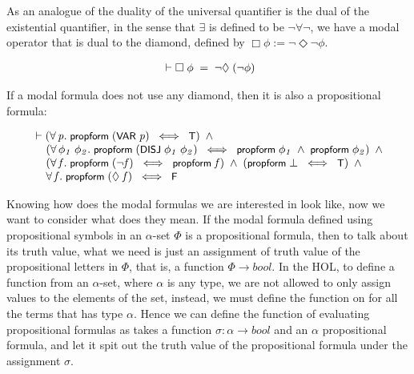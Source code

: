 \documentclass[letterpaper]{article}
\renewcommand{\HOLConst}[1]{{\textsf{\upshape\small #1}}}
\newenvironment{holmath}{\begin{displaymath}\begin{array}{l}}{\end{array}\end{displaymath}\ignorespacesafterend}
\begin{document}
As an analogue of the duality of the universal quantifier is the dual of the existential quantifier, in the sense that $\exists$ is defined to be $\lnot\forall\lnot$, we have a modal operator that is dual to the diamond, defined by $\Box \phi:= \lnot\Diamond \lnot \phi$. 

\begin{holmath}
  \ensuremath{\HOLTokenTurnstile}\HOLSymConst{\ensuremath{\Box}}\;\HOLFreeVar{\ensuremath{\phi}}\;\HOLSymConst{=}\;\HOLSymConst{\HOLTokenNeg{}}\HOLSymConst{\ensuremath{\Diamond}}\;(\HOLSymConst{\HOLTokenNeg{}}\HOLFreeVar{\ensuremath{\phi}})
\end{holmath}

If a modal formula does not use any diamond, then it is also a propositional formula:

\begin{holmath}
  \ensuremath{\HOLTokenTurnstile}(\HOLSymConst{\HOLTokenForall{}}\HOLBoundVar{p}.\;\HOLConst{propform}\;(\HOLConst{VAR}\;\HOLBoundVar{p})\;\HOLSymConst{\HOLTokenEquiv{}}\;\HOLConst{T})\;\HOLSymConst{\HOLTokenConj{}}\\
\;\;\;\;\;(\HOLSymConst{\HOLTokenForall{}}\HOLBoundVar{\ensuremath{\phi\sb{1}}}\;\HOLBoundVar{\ensuremath{\phi\sb{2}}}.\;\HOLConst{propform}\;(\HOLConst{DISJ}\;\HOLBoundVar{\ensuremath{\phi\sb{1}}}\;\HOLBoundVar{\ensuremath{\phi\sb{2}}})\;\HOLSymConst{\HOLTokenEquiv{}}\;\HOLConst{propform}\;\HOLBoundVar{\ensuremath{\phi\sb{1}}}\;\HOLSymConst{\HOLTokenConj{}}\;\HOLConst{propform}\;\HOLBoundVar{\ensuremath{\phi\sb{2}}})\;\HOLSymConst{\HOLTokenConj{}}\\
\;\;\;\;\;(\HOLSymConst{\HOLTokenForall{}}\HOLBoundVar{f}.\;\HOLConst{propform}\;(\HOLSymConst{\HOLTokenNeg{}}\HOLBoundVar{f})\;\HOLSymConst{\HOLTokenEquiv{}}\;\HOLConst{propform}\;\HOLBoundVar{f})\;\HOLSymConst{\HOLTokenConj{}}\;(\HOLConst{propform}\;\HOLSymConst{\ensuremath{\bot}}\;\HOLSymConst{\HOLTokenEquiv{}}\;\HOLConst{T})\;\HOLSymConst{\HOLTokenConj{}}\\
\;\;\;\;\;\HOLSymConst{\HOLTokenForall{}}\HOLBoundVar{f}.\;\HOLConst{propform}\;(\HOLSymConst{\ensuremath{\Diamond}}\;\HOLBoundVar{f})\;\HOLSymConst{\HOLTokenEquiv{}}\;\HOLConst{F}
\end{holmath}

Knowing how does the modal formulas we are interested in look like, now we want to consider what does they mean. If the modal formula defined using propositional symbols in an $\alpha$-set $\Phi$ is a propositional formula, then to talk about its truth value, what we need is just an assignment of truth value of the propositional letters in $\Phi$, that is, a function $\Phi\to bool$. In the HOL, to define a function from an $\alpha$-set, where $\alpha$ is any type, we are not allowed to only assign values to the elements of the set, instead, we must define the function on for all the terms that has type $\alpha$. Hence we can define the function of evaluating propositional formulas as takes a function $\sigma:\alpha\to bool$ and an $\alpha$ propositional formula, and let it spit out the truth value of the propositional formula under the assignment $\sigma$.
\end{document}
